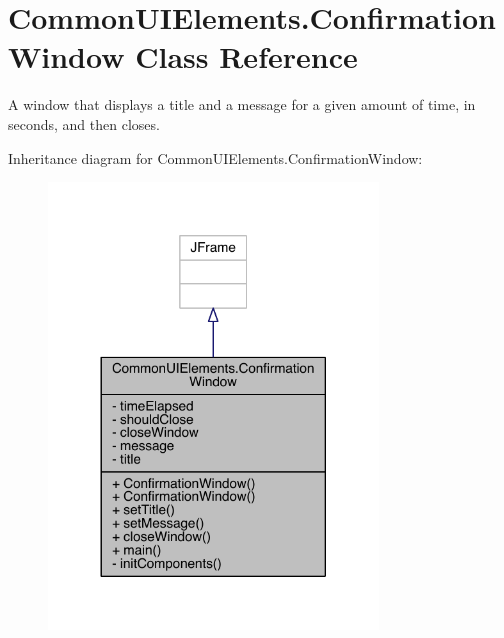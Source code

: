 \hypertarget{classCommonUIElements_1_1ConfirmationWindow}{}\section{Common\+U\+I\+Elements.\+Confirmation\+Window Class Reference}
\label{classCommonUIElements_1_1ConfirmationWindow}


A window that displays a title and a message for a given amount of time, in seconds, and then closes.  




Inheritance diagram for Common\+U\+I\+Elements.\+Confirmation\+Window\+:
\nopagebreak
\begin{figure}[H]
\begin{center}
\leavevmode
\includegraphics[width=248pt]{classCommonUIElements_1_1ConfirmationWindow__inherit__graph}
\end{center}
\end{figure}


